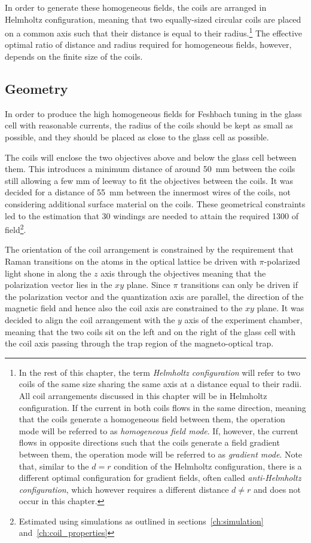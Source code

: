 In order to generate these homogeneous fields, the coils are arranged in Helmholtz configuration, meaning that two equally-sized circular coils are placed on a common axis such that their distance is equal to their radius.\footnote{In the rest of this chapter, the term \textit{Helmholtz configuration} will refer to two coils of the same size sharing the same axis at a distance equal to their radii. All coil arrangements discussed in this chapter will be in Helmholtz configuration. If the current in both coils flows in the same direction, meaning that the coils generate a homogeneous field between them, the operation mode will be referred to as \textit{homogeneous field mode}. If, however, the current flows in opposite directions such that the coils generate a field gradient between them, the operation mode will be referred to as \textit{gradient mode}. Note that, similar to the $d = r$ condition of the Helmholtz configuration, there is a different optimal configuration for gradient fields, often called \textit{anti-Helmholtz configuration}, which however requires a different distance $d \neq r$ and does not occur in this chapter.} The effective optimal ratio of distance and radius required for homogeneous fields, however, depends on the finite size of the coils.

\subsection*{Geometry}
In order to produce the high homogeneous fields for Feshbach tuning in the glass cell with reasonable currents, the radius of the coils should be kept as small as possible, and they should be placed as close to the glass cell as possible.

The coils will enclose the two objectives above and below the glass cell between them. This introduces a minimum distance of around \SI{50}{\milli\meter} between the coils still allowing a few \si[]{\milli\meter} of leeway to fit the objectives between the coils. It was decided for a distance of \SI{55}{\milli\meter} between the innermost wires of the coils, not considering additional surface material on the coils. These geometrical constraints led to the estimation that 30 windings are needed to attain the required \SI{1300}{\gauss} of field\footnote{Estimated using simulations  as outlined in sections~\ref{ch:simulation} and~\ref{ch:coil_properties}}.

The orientation of the coil arrangement is constrained by the requirement that Raman transitions on the atoms in the optical lattice be driven with $\pi$-polarized light shone in along the $z$ axis through the objectives meaning that the polarization vector lies in the $xy$ plane. Since $\pi$ transitions can only be driven if the polarization vector and the quantization axis are parallel, the direction of the magnetic field and hence also the coil axis are constrained to the $xy$ plane. It was decided to align the coil arrangement with the $y$ axis of the experiment chamber, meaning that the two coils sit on the left and on the right of the glass cell with the coil axis passing through the trap region of the magneto-optical trap.

